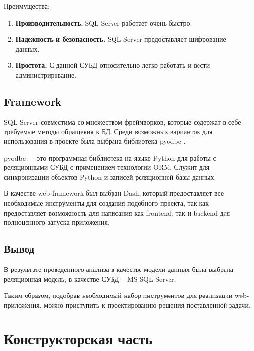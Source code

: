 Преимущества:

\begin{enumerate}
	\item \textbf{Производительность.} SQL Server работает очень быстро.
	\item \textbf{Надежность и безопасность.} SQL Server предоставляет шифрование данных.
	\item \textbf{Простота.}  С данной СУБД относительно легко работать и вести администрирование.
\end{enumerate}

\subsection*{Framework}%

SQL Server совместима со множеством фреймворков, которые содержат в себе требуемые методы обращения к БД. Среди возможных вариантов для использования в проекте была выбрана библиотека pyodbc \cite{litlink2}.

pyodbc — это программная библиотека на языке Python для работы с реляционными СУБД с применением технологии ORM. Служит для синхронизации объектов Python и записей реляционной базы данных. \cite{litlink5}

В качестве web-framework был выбран Dash, который предоставляет все необходимые инструменты для создания подобного проекта, так как предоставляет возможность для написания как frontend, так и backend для полноценного запуска приложения. \cite{litlink3}

\subsection*{Вывод}%

В результате проведенного анализа в качестве модели данных была выбрана реляционная модель, в качестве СУБД – MS-SQL Server.

Таким образом, подобрав необходимый набор инструментов для реализации web-приложения, можно приступить к проектированию решения поставленной задачи.


\newpage
\section*{Конструкторская часть}%

